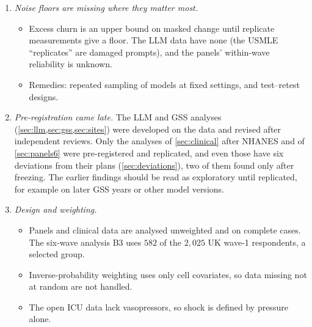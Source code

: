 \documentclass[11pt]{article}
\theoremstyle{definition}
\theoremstyle{remark}
\begin{document}
\begin{enumerate}[leftmargin=*]
\begin{itemize}[nosep]
  \item The surfaces, branes and leximin couplings of real $2\times3$ systems are computed exactly. Branes of real $3\times3$ systems are not.
  \item On survey margins the chamber, hence the surface, is rarely decided.
  \item Tested now (\cref{sec:forecast}): the distance to the walls and a previous chamber change forecast the next point-estimate chamber
    change of GSS systems beyond the margins. Per-stay ICU geometry forecasts neither death nor shock, because those systems are almost
    all broken. A forecast of decided tears, and of outcomes from nondegenerate systems, is still missing.
  \end{itemize}
\item \emph{Noise floors are missing where they matter most.}
  \begin{itemize}[nosep]
  \item Excess churn is an upper bound on masked change until replicate measurements give a floor. The LLM data have none (the USMLE
    ``replicates'' are damaged prompts), and the panels' within-wave reliability is unknown.
  \item Remedies: repeated sampling of models at fixed settings, and test--retest designs.
  \end{itemize}
\item \emph{Pre-registration came late.} The LLM and GSS analyses (\cref{sec:llm,sec:gss,sec:sites}) were developed on the data and revised
  after independent reviews. Only the analyses of \cref{sec:clinical} after NHANES and of \cref{sec:panels6} were pre-registered and
  replicated, and even those have six deviations from their plans (\cref{sec:deviations}), two of them found only after freezing. The
  earlier findings should be read as exploratory until replicated, for example on later GSS years or other model versions.
\item \emph{Design and weighting.}
  \begin{itemize}[nosep]
  \item Panels and clinical data are analysed unweighted and on complete cases. The six-wave analysis B3 uses $582$ of the $2{,}025$ UK
    wave-1 respondents, a selected group.
  \item Inverse-probability weighting uses only cell covariates, so data missing not at random are not handled.
  \item The open ICU data lack vasopressors, so shock is defined by pressure alone.

\end{itemize}
\end{enumerate}
\end{document}
